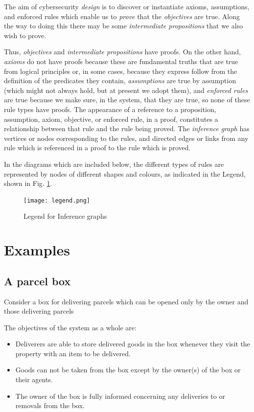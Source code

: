 The aim of cybersecurity {\em design} is to discover or instantiate axioms,
assumptions, and enforced rules which enable us to {\em prove} that
the {\em objectives} are true. Along the way to doing this there may
be some {\em intermediate propositions} that we also wish to prove.

Thus, {\em objectives} and {\em intermediate propositions} have proofs.
On the other hand, {\em axioms} do not have proofs because these are
fundamental truths that are true from logical principles
or, in some cases, because they express follow from the definition 
of the predicates they contain, {\em assumptions}
are true by assumption (which might not always hold, but at present
we adopt them), and {\em enforced rules} are true because we make sure,
in the system, that they are true, so none of these rule types
have proofs.
The appearance of a reference to a
proposition, assumption, axiom, objective, or enforced
rule, in a proof,  constitutes a relationship between that rule
and the rule being proved. The {\em inference graph} has vertices or
nodes corresponding to the rules, and directed edges or links from any
rule which is referenced in a proof to the rule which is proved.


In the diagrams which are included below, the different types of rules
are represented by nodes of different shapes and colours, as 
indicated in the Legend, shown in Fig. \ref{legend}.
\begin{figure}[bhpt]
	\centering
		\leavevmode\texttt{[image: legend.png]}\ \\
		\caption{Legend for Inference graphs}\label{legend}
\end{figure}

\section{Examples}\label{examplesec}

\subsection{A parcel box}

Consider a box for delivering parcels which can be opened only by the owner and those delivering parcels

The objectives of the system as a whole are:
\begin{itemize}
\item Deliverers are able to store delivered goods in the box whenever they visit the
property with an item to be delivered.
\item Goods can not be taken from the box except by the owner(s) of the box or their agents.
\item The owner of the box is fully informed concerning any deliveries to or removals
from the box.
\end{itemize}


